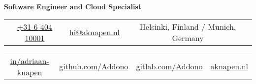 \documentclass[11pt,a4paper,sans]{moderncv}
\begin{document}
\makecvtitle


\vspace*{-18mm}
\begin{center}\textbf{Software Engineer and Cloud Specialist}\end{center}

\begin{center}
	\begin{tabular}{ c c c }
		\faMobile\enspace 
		\href{tel:+31640410001}{+31 6 404 10001}
		\enspace & \enspace 
		\href{mailto:hi@aknapen.nl}{hi@aknapen.nl}
		\enspace & \enspace 
		\faHome\enspace Helsinki, Finland / Munich, Germany
	\end{tabular}
			
	\begin{tabular}{ c c c c }
		\faLinkedin\enspace \color{blue} \href{https://www.linkedin.com/in/adriaan-knapen/}{in/adriaan-knapen} &
		\enspace\enspace\faGithub\enspace \color{blue} \href{https://github.com/Addono}{github.com/Addono} & \enspace\enspace\faGitlab\enspace \color{blue} \href{https://gitlab.com/Addono}{gitlab.com/Addono} & \enspace\enspace\faHome\enspace \color{blue} \href{https://aknapen.nl}{aknapen.nl} 
	\end{tabular}
\end{center}
\end{document}
